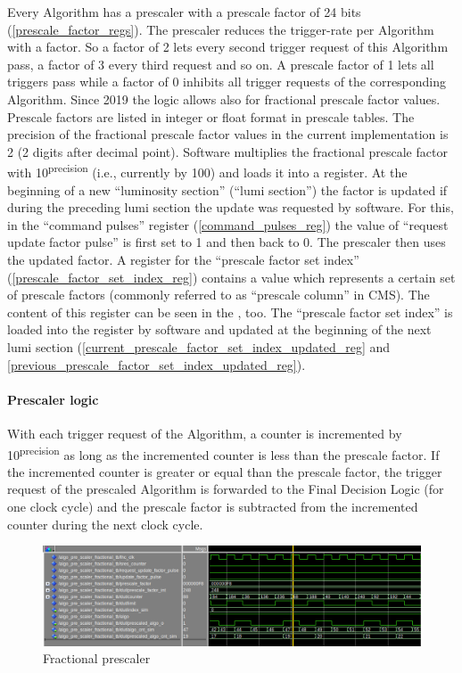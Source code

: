 Every Algorithm has a prescaler with a prescale factor of 24 bits (\ref{prescale_factor_regs}). The prescaler reduces the trigger-rate per Algorithm with a factor. So a factor of 2 lets every second trigger request of this Algorithm pass, a factor of 3 every third request and so on. 
A prescale factor of 1 lets all triggers pass while a factor of 0 inhibits all trigger requests of the corresponding Algorithm.
Since 2019 the logic allows also for fractional prescale factor values. Prescale factors are listed in integer or float
format in prescale tables. 
The precision of the fractional prescale factor values in the current implementation is 2 (2 digits after decimal point). 
Software multiplies the fractional prescale factor with 10\textsuperscript{\tiny{precision}} (i.e., currently by 100) and loads it into a register.
At the beginning of a new “luminosity section” (“lumi section”) the factor is updated if during the preceding lumi section the update was requested by software. 
For this, in the “command pulses” register (\ref{command_pulses_reg}) the value of “request update factor pulse” is first set to 1 and then back to 0. 
The prescaler then uses the updated factor. 
A register for the “prescale factor set index” (\ref{prescale_factor_set_index_reg}) contains a value which represents a certain set
of prescale factors (commonly referred to as “prescale column” in CMS). 
The content of this register can be seen in the \record, too. 
The “prescale factor set index” is loaded into the register by software and updated at the beginning of
the next lumi section (\ref{current_prescale_factor_set_index_updated_reg} and \ref{previous_prescale_factor_set_index_updated_reg}).

\paragraph{Prescaler logic}

With each trigger request of the Algorithm, a counter is incremented by 10\textsuperscript{\tiny{precision}} as long as the
incremented counter is less than the prescale factor. If the incremented counter is greater or equal than the prescale
factor, the trigger request of the prescaled Algorithm is forwarded to the Final Decision Logic (for one clock cycle)
and the prescale factor is subtracted from the incremented counter during the next clock cycle.

\begin{figure}[htb]
\centering
\includegraphics[width=15cm]{figures/Screenshot_fractional_prescalers}
\caption{Fractional prescaler}
\label{fig:fdl:fractional_prescalers}
\end{figure}

